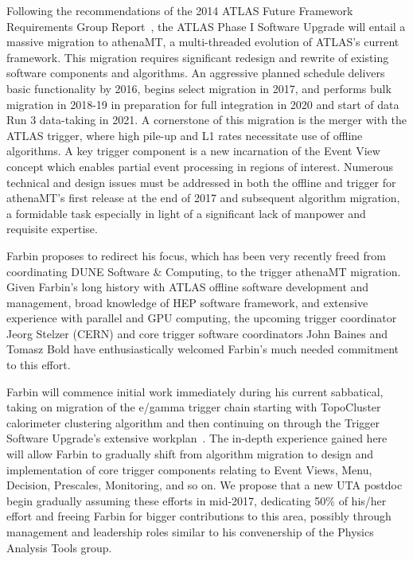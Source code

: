 \label{sec:af_trigger}
Following the recommendations of the 2014 ATLAS Future Framework
Requirements Group Report~\cite{}, the ATLAS Phase I Software Upgrade
will entail a massive migration to athenaMT, a multi-threaded
evolution of ATLAS's current framework. This migration requires
significant redesign and rewrite of existing software components and
algorithms. An aggressive planned schedule delivers basic
functionality by 2016, begins select migration in 2017, and performs
bulk migration in 2018-19 in preparation for full integration in 2020
and start of data Run 3 data-taking in 2021. A cornerstone of this
migration is the merger with the ATLAS trigger, where high pile-up and
L1 rates necessitate use of offline algorithms. A key trigger
component is a new incarnation of the Event View concept which enables
partial event processing in regions of interest. Numerous technical
and design issues must be addressed in both the offline and trigger
for athenaMT's first release at the end of 2017 and subsequent
algorithm migration, a formidable task especially in light of a
significant lack of manpower and requisite expertise.


Farbin proposes to redirect his focus, which has been very recently
freed from coordinating DUNE Software \& Computing, to the trigger
athenaMT migration. Given Farbin's long history with ATLAS offline
software development and management, broad knowledge of HEP software
framework, and extensive experience with parallel and GPU computing,
the upcoming trigger coordinator Jeorg Stelzer (CERN) and core trigger
software coordinators John Baines and Tomasz Bold have
enthusiastically welcomed Farbin's much needed commitment to this
effort. 

Farbin will commence initial work immediately during his current
sabbatical, taking on migration of the e/gamma trigger chain starting
with TopoCluster calorimeter clustering algorithm and then continuing
on through the Trigger Software Upgrade's extensive
workplan~\cite{}. The in-depth experience gained here will allow
Farbin to gradually shift from algorithm migration to design and
implementation of core trigger components relating to Event Views,
Menu, Decision, Prescales, Monitoring, and so on.  We propose that a
new UTA postdoc begin gradually assuming these efforts in mid-2017,
dedicating 50\% of his/her effort and freeing Farbin for bigger
contributions to this area, possibly through management and leadership
roles similar to his convenership of the Physics Analysis Tools group.

